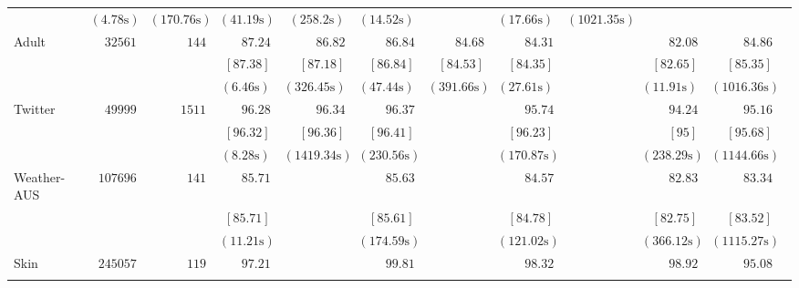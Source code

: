 \begin{table*}[h]
\begin{center}
\begin{tabular}{l  r  r r r r r r r rrr}
			& $  ( 4.78 \text{s} ) $    & $  ( 170.76 \text{s} ) $    & $  ( 41.19 \text{s} ) $    & $  ( 258.2 \text{s} ) $    & $  ( 14.52 \text{s} ) $    &       & $  ( 17.66 \text{s} ) $    & $  ( 1021.35 \text{s} ) $   \\[.1cm] 
			{ Adult}   & $  32561 $  & $  144 $  & $   87.24  $    & $   86.82  $    & $   86.84  $    & $   84.68  $    & $   84.31  $    &   \multicolumn{1}{c}{\multirow{3}{*}{\textemdash}}       & $   82.08  $    & $   84.86  $   \\ & & 
			& $  [ 87.38 ] $    & $  [ 87.18 ] $    & $  [ 86.84 ] $    & $  [ 84.53 ] $    & $  [ 84.35 ] $    &       & $  [ 82.65 ] $    & $  [ 85.35 ] $   \\ & & 
			& $  ( 6.46 \text{s} ) $    & $  ( 326.45 \text{s} ) $    & $  ( 47.44 \text{s} ) $    & $  ( 391.66 \text{s} ) $    & $  ( 27.61 \text{s} ) $    &       & $  ( 11.91 \text{s} ) $    & $  ( 1016.36 \text{s} ) $   \\[.1cm] 
			{ Twitter}   & $  49999 $  & $  1511 $  & $   96.28  $    & $   96.34  $    & $   96.37  $    &   \multicolumn{1}{c}{\multirow{3}{*}{\textemdash}}       & $   95.74  $    &   \multicolumn{1}{c}{\multirow{3}{*}{\textemdash}}       & $   94.24  $    & $   95.16  $   \\ & & 
			& $  [ 96.32 ] $    & $  [ 96.36 ] $    & $  [ 96.41 ] $    &       & $  [ 96.23 ] $    &       & $  [ 95] $    & $  [ 95.68 ] $   \\ & & 
			& $  ( 8.28 \text{s} ) $    & $  ( 1419.34 \text{s} ) $    & $  ( 230.56 \text{s} ) $    &       & $  ( 170.87 \text{s} ) $    &       & $  ( 238.29 \text{s} ) $    & $  ( 1144.66 \text{s} ) $   \\[.1cm] 
			{ Weather-AUS}   & $  107696 $  & $  141 $  & $   85.71  $    &   \multicolumn{1}{c}{\multirow{3}{*}{\textemdash}}       & $   85.63  $    &   \multicolumn{1}{c}{\multirow{3}{*}{\textemdash}}       & $   84.57  $    &   \multicolumn{1}{c}{\multirow{3}{*}{\textemdash}}       & $   82.83  $    & $   83.34  $   \\ & & 
			& $  [ 85.71 ] $    &       & $  [ 85.61 ] $    &       & $  [ 84.78 ] $    &       & $  [ 82.75 ] $    & $  [ 83.52 ] $   \\ & & 
			& $  ( 11.21 \text{s} ) $    &       & $  ( 174.59 \text{s} ) $    &       & $  ( 121.02 \text{s} ) $    &       & $  ( 366.12 \text{s} ) $    & $  ( 1115.27 \text{s} ) $   \\[.1cm] 
			{ Skin}   & $  245057 $  & $  119 $  & $   97.21  $    &   \multicolumn{1}{c}{\multirow{3}{*}{\textemdash}}       & $   99.81  $    &   \multicolumn{1}{c}{\multirow{3}{*}{\textemdash}}       & $   98.32  $    &   \multicolumn{1}{c}{\multirow{3}{*}{\textemdash}}       & $   98.92  $    & $   95.08  $   \\ & & 

\end{tabular}
\end{center}
\end{table*}
